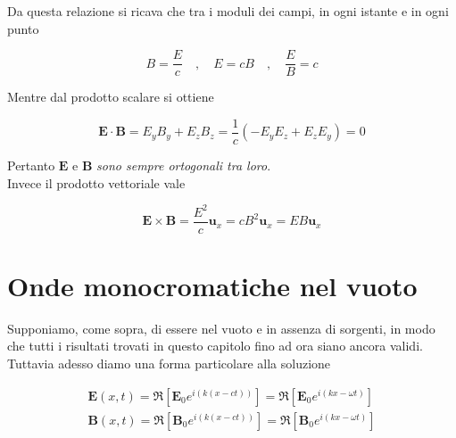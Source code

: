 Da questa relazione si ricava che tra i moduli dei campi, in ogni istante e in ogni punto 

\begin{tcolorbox}[colback=yellow!10!white, colframe=orange!70!black, boxrule=0.8pt]
\begin{equation}
    B = \frac{E}{c} \quad , \quad E = cB \quad , \quad \frac{E}{B} = c
\end{equation}
\end{tcolorbox}

Mentre dal prodotto scalare si ottiene 

\begin{tcolorbox}[colback=yellow!10!white, colframe=orange!70!black, boxrule=0.8pt]
\begin{equation}
    \mathbf{E} \cdot \mathbf{B} = E_y B_y + E_z B_z = \frac{1}{c} (-E_y E_z + E_z E_y) = 0
\end{equation}
\end{tcolorbox}

Pertanto $\mathbf{E}$ e $\mathbf{B}$ \emph{sono sempre ortogonali tra loro}. \\

Invece il prodotto vettoriale vale 

\begin{tcolorbox}[colback=yellow!10!white, colframe=orange!70!black, boxrule=0.8pt]
\begin{equation}
    \mathbf{E} \times \mathbf{B} = \frac{E^2}{c} \mathbf{u}_x = c B^2 \mathbf{u}_x = E B \mathbf{u}_x
\end{equation}
\end{tcolorbox}

\newpage

\section{Onde monocromatiche nel vuoto}

Supponiamo, come sopra, di essere nel vuoto e in assenza di sorgenti, in modo che tutti i risultati trovati in questo capitolo fino ad ora siano ancora validi. Tuttavia adesso diamo una forma particolare alla soluzione 

\begin{tcolorbox}[colback=yellow!10!white, colframe=orange!70!black, boxrule=0.8pt]
\begin{align}
    \mathbf{E}(x, t) = \Re[\mathbf{E}_0 e^{i(k(x - c t))}] = \Re[\mathbf{E}_0 e^{i(kx - \omega t)}] \\
    \mathbf{B}(x, t) = \Re[\mathbf{B}_0 e^{i(k(x - c t))}] = \Re[\mathbf{B}_0 e^{i(kx - \omega t)}] 
\end{align}
\end{tcolorbox}

